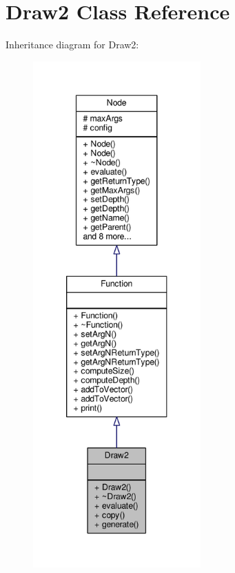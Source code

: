 \hypertarget{classDraw2}{}\section{Draw2 Class Reference}
\label{classDraw2}


Inheritance diagram for Draw2\+:
\nopagebreak
\begin{figure}[H]
\begin{center}
\leavevmode
\includegraphics[height=550pt]{classDraw2__inherit__graph}
\end{center}
\end{figure}


